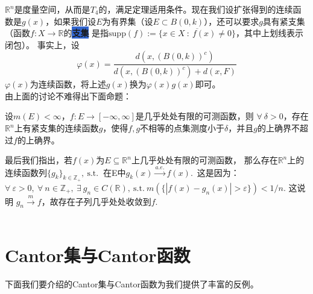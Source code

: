 \documentclass[color=green,thmcnt=section,lang=cn,12pt]{elegantbook}
\makeatletter
\numberwithin{equation}{section}%
\numberwithin{figure}{section}%
\newcommand{\RR}{\mathbb{R}}
\renewcommand{\RN}{\RR^n}
\newcommand{\ZZ}{\mathbb{Z}}
\newcommand{\ee}{\varepsilon}
\newcommand{\any}{\forall \ }
\newcommand{\exi}{\exists \ }
\newcommand{\sothat}{\ \textrm{s.t.}\ }
\newcommand{\csf}[1]{\{#1_k\}_{k\in \ZZ_+}} %
\newcommand{\bi}[2]{\colorbox{highlight}{\textbf{\textcolor[RGB]{14,14,94}{#1}}}\index{#2@#1} \label{#2}} %
\makeatother
\begin{document}
$\RN$是度量空间，从而是$T_4$的，满足定理适用条件。现在我们设扩张得到的连续函数是$g(x)$，如果我们设$E$为有界集（设$E\subset B(0,k)$），还可以要求$g$具有紧支集
（函数$f:X\to \RR$的\bi{支集}{zhiji}是指$\textrm{supp}(f):=\overline{\{x\in X\ :\ f(x)\neq 0\}}$，其中上划线表示闭包）。
事实上，设\begin{equation*}
    \varphi(x)=\frac{d(x,(B(0,k))^c)}{d(x,(B(0,k))^c)+d(x,F)}
\end{equation*}
$\varphi(x)$为连续函数，将上述$g(x)$换为$\varphi(x)g(x)$即可。
\\


由上面的讨论不难得出下面命题：
\begin{proposition}\label{jinzhijilianxuhanshubijinkecehanshu}
    设$m(E)<\infty$，$f:E\to [-\infty,\infty]$是几乎处处有限的可测函数，则
    $\any \delta>0$，存在$\RN$上有紧支集的连续函数$g$，使得$f,g$不相等的点集测度小于$\delta$，并且$g$的上确界不超过$f$的上确界。
\end{proposition}

最后我们指出，若$f(x)$为$E\subseteq \RN$上几乎处处有限的可测函数，
那么存在$\RN$上的连续函数列$\csf{g},\sothat$ 在E中$g_k(x)\xrightarrow{a.e.}f(x)$.\ 
这是因为：$\any \ee>0,\ \any n\in \ZZ_+,\ \exi g_n\in C(\RR),\sothat m(\{|f(x)-g_n(x)|>\ee\})<1/n$. 这说明
$g_n\xrightarrow{m}f$，故存在子列几乎处处收敛到$f$.\\
\ 

\newpage\section{Cantor集与Cantor函数}
下面我们要介绍的Cantor集与Cantor函数为我们提供了丰富的反例。
\end{document}
